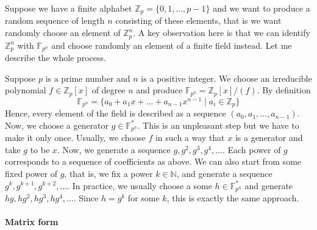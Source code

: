 Suppose we have a finite alphabet $\mathbb Z_p = \{0,1,\ldots,p-1\}$ and we want to produce a random sequence of length $n$ consisting of these elements, that is we want randomly choose an element of $\mathbb Z_p^n$.
A key observation here is that we can identify $\mathbb Z_p^n$ with $\mathbb F_{p^n}$ and choose randomly an element of a finite field instead.
Let me describe the whole process.


Suppose $p$ is a prime number and $n$ is a positive integer.
We choose an irreducible polynomial $f\in \mathbb Z_p[x]$ of degree $n$ and produce $\mathbb F_{p^n} = \mathbb Z_p[x]/(f)$.
By definition
\[
\mathbb F_{p^n} = \{a_0 + a_1 x + \ldots + a_{n-1}x^{n-1}\mid a_i\in \mathbb Z_p\}
\]
Hence, every element of the field is described as a sequence $(a_0, a_1,\ldots,a_{n-1})$.
Now, we choose a generator $g\in \mathbb F_{p^n}^*$.
This is an unpleasant step but we have to make it only once.
Usually, we choose $f$ in such a way that $x$ is a generator and take $g$ to be $x$.
Now, we generate a sequence $g, g^2, g^3, g^4,\ldots$.
Each power of $g$ corresponds to a sequence of coefficients as above.
We can also start from some fixed power of $g$, that is, we fix a power $k\in \mathbb N$, and generate a sequence $g^k, g^{k+1}, g^{k+2}, \ldots$.
In practice, we usually choose a some $h\in \mathbb F_{p^n}^*$ and generate $hg, hg^2, hg^3, hg^4,\ldots$.
Since $h = g^k$ for some $k$, this is exactly the same approach.

\paragraph{Matrix form}

